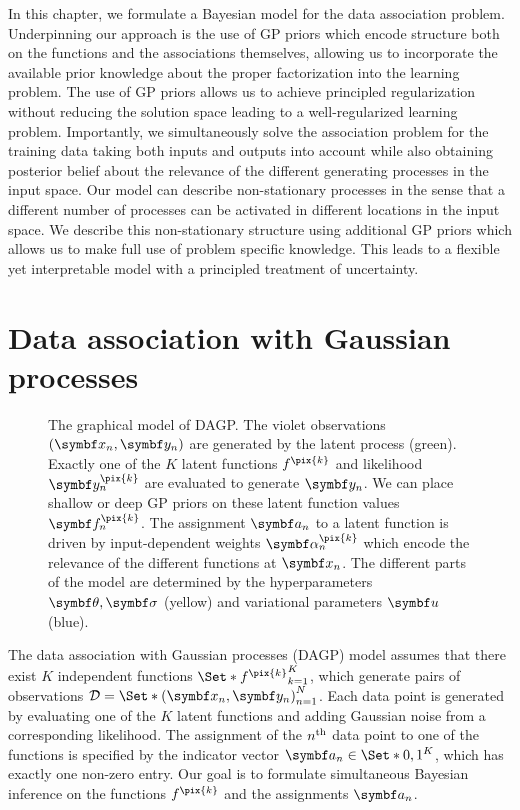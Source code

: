In this chapter, we formulate a Bayesian model for the data association problem.
Underpinning our approach is the use of GP priors which encode structure both on the functions and the associations themselves, allowing us to incorporate the available prior knowledge about the proper factorization into the learning problem.
The use of GP priors allows us to achieve principled regularization without reducing the solution space leading to a well-regularized learning problem.
Importantly, we simultaneously solve the association problem for the training data taking both inputs and outputs into account while also obtaining posterior belief about the relevance of the different generating processes in the input space.
Our model can describe non-stationary processes in the sense that a different number of processes can be activated in different locations in the input space.
We describe this non-stationary structure using additional GP priors which allows us to make full use of problem specific knowledge.
This leads to a flexible yet interpretable model with a principled treatment of uncertainty.

\section{Data association with Gaussian processes}
\label{toc:data_association:model}
\begin{figure}[t]
    \centering
    
    \caption[DAGP graphical model]{
    \label{fig:data_association:data_association_graphical_model}
    The graphical model of DAGP.
    The violet observations $(\mat{x}_n, \mat{y}_n)$ are generated by the latent process (green).
    Exactly one of the $K$ latent functions $f^{\pix{k}}$ and likelihood $\mat{y}_n^{\pix{k}}$ are evaluated to generate $\mat{y}_n$.
    We can place shallow or deep GP priors on these latent function values $\mat{f}_n^{\pix{k}}$.
    The assignment $\mat{a}_n$ to a latent function is driven by input-dependent weights $\mat{\alpha}_n^{\pix{k}}$ which encode the relevance of the different functions at $\mat{x}_n$.
    The different parts of the model are determined by the hyperparameters $\mat{\theta}, \mat{\sigma}$ (yellow) and variational parameters $\mat{u}$ (blue).
    }
\end{figure}
The data association with Gaussian processes (DAGP) model assumes that there exist $K$ independent functions $\Set*{f^{\pix{k}}}_{k=1}^K$, which generate pairs of observations $\Dc = \Set*{(\mat{x}_n, \mat{y}_n)}_{n=1}^N$.
Each data point is generated by evaluating one of the $K$ latent functions and adding Gaussian noise from a corresponding likelihood.
The assignment of the $n^{\text{th}}$ data point to one of the functions is specified by the indicator vector $\mat{a}_n \in \Set*{0, 1}^K$, which has exactly one non-zero entry.
Our goal is to formulate simultaneous Bayesian inference on the functions $f^{\pix{k}}$ and the assignments $\mat{a}_n$.

